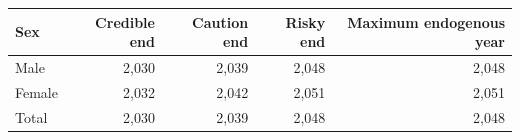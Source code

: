 \begingroup
\renewcommand{\arraystretch}{1.08}
\setlength{\tabcolsep}{4pt}
\begin{tabular}{lrrrr}
\toprule
Sex & Credible end & Caution end & Risky end & Maximum endogenous year \\
\midrule
Male & 2,030 & 2,039 & 2,048 & 2,048 \\
Female & 2,032 & 2,042 & 2,051 & 2,051 \\
Total & 2,030 & 2,039 & 2,048 & 2,048 \\
\bottomrule
\end{tabular}
\endgroup
